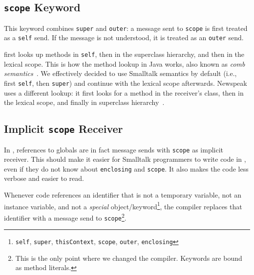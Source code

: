 

\subsection{\texttt{scope} Keyword}
This keyword combines \texttt{super} and \texttt{outer}: a message sent to \texttt{scope} is first treated as a \texttt{self} send. If the message is not understood, it is treated as an \texttt{outer} send.

\msname first looks up methods in \texttt{self}, then in the superclass hierarchy, and then in the lexical scope. This is how the method lookup in Java works, also known as \emph{comb semantics}~\cite{bracha2007interaction}. We effectively decided to use Smalltalk semantics by default (i.e., first \texttt{self}, then \texttt{super}) and continue with the lexical scope afterwards. Newspeak uses a different lookup: it first looks for a method in the receiver's class, then in the lexical scope, and finally in superclass hierarchy~\cite{bracha:modules_as_objects}. 


\subsection{Implicit \texttt{scope} Receiver}
\label{sec:con_implz_recv}
In \msname, references to globals are in fact message sends with \texttt{scope} as implicit receiver. This should make it easier for Smalltalk programmers to write code in \msname, even if they do not know about \texttt{enclosing} and \texttt{scope}. It also makes the code less verbose and easier to read.

Whenever code references an identifier that is not a temporary variable, not an instance variable, and not a \emph{special} object/keyword\footnote{\texttt{self}, \texttt{super}, \texttt{thisContext}, \texttt{scope}, \texttt{outer}, \texttt{enclosing}}, the compiler replaces that identifier with a message send to \texttt{scope}\footnote{This is the only point where we changed the compiler. Keywords are bound as method literals.}.


